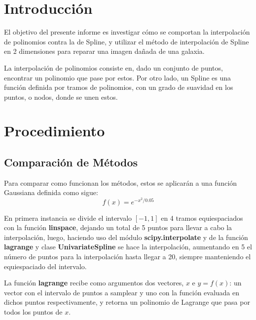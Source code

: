 \documentclass[a4paper, 11pt, spanish]{article}
\begin{document}
\clearpage


\newpage

\tableofcontents %
\listoffigures %

\newpage

\section{Introducci\'on}
El objetivo del presente informe es investigar c\'omo se comportan la interpolaci\'on de polinomios contra la de Spline, y utilizar el m\'etodo de interpolaci\'on de Spline en 2 dimensiones para reparar una imagen da\~nada de una galaxia.

La interpolaci\'on de polinomios consiste en, dado un conjunto de puntos, encontrar un polinomio que pase por estos. Por otro lado, un Spline es una funci\'on definida por tramos de polinomios, con un grado de suavidad en los puntos, o nodos, donde se unen estos.

\section{Procedimiento}
\subsection{Comparaci\'on de M\'etodos}
Para comparar como funcionan los m\'etodos, estos se aplicar\'an a una funci\'on Gaussiana definida como sigue:
\begin{equation}
	f(x) = e^{-x^{2}/0.05}
\end{equation}

En primera instancia se divide el intervalo $[-1,1]$ en 4 tramos equiespaciados con la funci\'on \textbf{linspace}, dejando un total de 5 puntos para llevar a cabo la interpolaci\'on, luego, haciendo uso del m\'odulo \textbf{scipy.interpolate} y de la funci\'on \textbf{lagrange} y clase \textbf{UnivariateSpline} se hace la interpolaci\'on, aumentando en 5 el n\'umero de puntos para la interpolaci\'on hasta llegar a 20, siempre manteniendo el equiespaciado del intervalo.

La funci\'on \textbf{lagrange} recibe como argumentos dos vectores, $x$ e $y = f(x)$: un vector con el intervalo de puntos a samplear y uno con la funci\'on evaluada en dichos puntos respectivamente, y retorna un polinomio de Lagrange que pasa por todos los puntos de $x$. 
\end{document}
